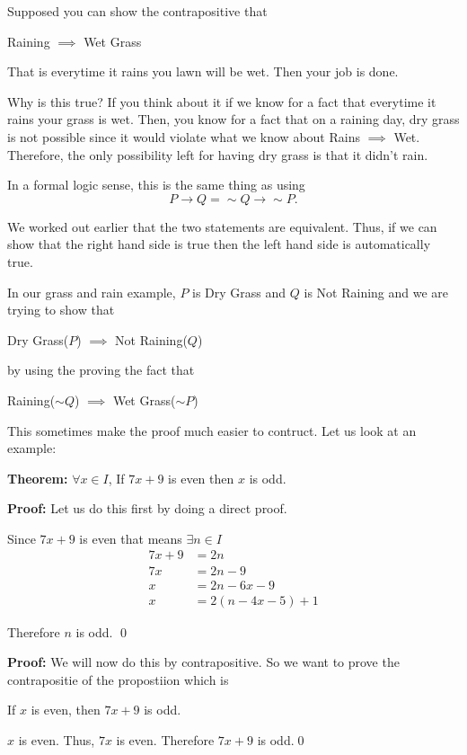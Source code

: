 \documentclass[a4paper, 12pt]{article}
\newcommand{\theorem}{\noindent\textbf{Theorem:} }
\renewcommand{\proof}{\noindent\textbf{Proof:} }
\newcommand{\qedd}{\qed\newline}
\theoremstyle{examplestyle}
\begin{document}
\begin{multicols}{2}
Supposed you can show the contrapositive that
\begin{center}
	Raining $\implies$ Wet Grass
\end{center}
That is everytime it rains you lawn will be wet. Then your job is done.

Why is this true? If you think about it if we know for a fact that everytime it rains your grass is wet. Then, you know for a fact that on a raining day, dry grass is not possible since it would violate what we know about Rains $\implies$ Wet. Therefore, the only possibility left for having dry grass is that it didn't rain.

In a formal logic sense, this is the same thing as using
\[
	P \to Q = \sim Q \to \sim P.
\]

We worked out earlier that the two statements are equivalent. Thus, if we can show that the right hand side is true then the left hand side is automatically true. 

In our grass and rain example, $P$ is Dry Grass and $Q$ is Not Raining and we are trying to show that
\begin{center}
	Dry Grass($P$) $\implies$ Not Raining($Q$)
\end{center}
by using the proving the fact that
\begin{center}
	Raining($\sim Q$) $\implies$ Wet Grass($\sim P$)
\end{center}

This sometimes make the proof much easier to contruct. Let us look at an example:

\theorem $\forall x \in I$, If $7x+9$ is even then $x$ is odd.

\proof Let us do this first by doing a direct proof.

Since $7x+9$ is even that means $\exists n \in I$
\begin{align*}
	7x+9 &= 2n\\
	7x &= 2n-9\\
	x &= 2n - 6x -9\\
	x & = 2(n-4x -5) +1
\end{align*}

Therefore $n$ is odd. \qedd

\proof We will now do this by contrapositive. So we want to prove the contrapositie of the propostiion which is
\begin{center}
	If $x$ is even, then $7x+9$ is odd. 
\end{center}

$x$ is even. Thus, $7x$ is even. Therefore $7x+9$ is odd.\qedd


\end{multicols}
\end{document}

